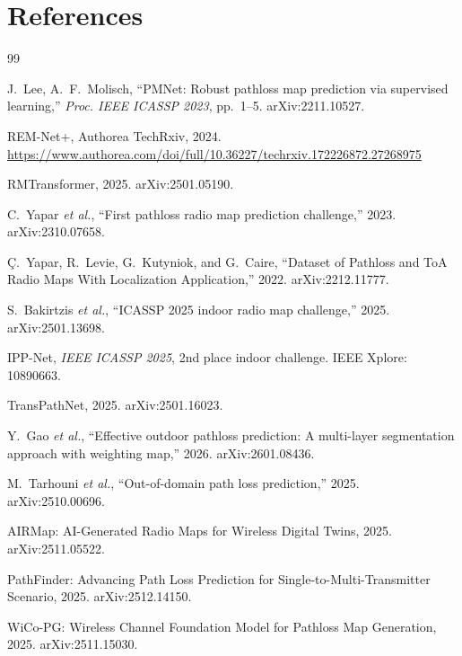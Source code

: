 \documentclass[11pt,a4paper]{article}
\begin{document}
\section*{References}
\label{sec:references}

\begin{thebibliography}{99}

J.~Lee, A.~F.~Molisch,
``PMNet: Robust pathloss map prediction via supervised learning,''
\textit{Proc. IEEE ICASSP 2023}, pp.~1--5.
arXiv:2211.10527.

REM-Net+, Authorea TechRxiv, 2024.
\url{https://www.authorea.com/doi/full/10.36227/techrxiv.172226872.27268975}

RMTransformer, 2025.
arXiv:2501.05190.

C.~Yapar \textit{et al.},
``First pathloss radio map prediction challenge,''
2023.
arXiv:2310.07658.

Ç.~Yapar, R.~Levie, G.~Kutyniok, and G.~Caire,
``Dataset of Pathloss and ToA Radio Maps With Localization Application,''
2022.
arXiv:2212.11777.

S.~Bakirtzis \textit{et al.},
``ICASSP 2025 indoor radio map challenge,''
2025.
arXiv:2501.13698.

IPP-Net,
\textit{IEEE ICASSP 2025}, 2nd place indoor challenge.
IEEE Xplore: 10890663.

TransPathNet,
2025.
arXiv:2501.16023.

Y.~Gao \textit{et al.},
``Effective outdoor pathloss prediction: A multi-layer segmentation approach
with weighting map,''
2026.
arXiv:2601.08436.

M.~Tarhouni \textit{et al.},
``Out-of-domain path loss prediction,''
2025.
arXiv:2510.00696.

AIRMap: AI-Generated Radio Maps for Wireless Digital Twins,
2025.
arXiv:2511.05522.

PathFinder: Advancing Path Loss Prediction for Single-to-Multi-Transmitter Scenario,
2025.
arXiv:2512.14150.

WiCo-PG: Wireless Channel Foundation Model for Pathloss Map Generation,
2025.
arXiv:2511.15030.


\end{thebibliography}
\end{document}
